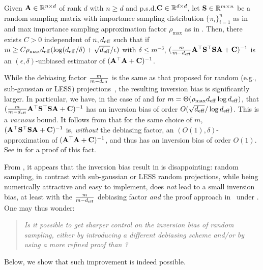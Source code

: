 \documentclass[11pt,a4paper]{article}
\begin{document}
\begin{proposition}
\label{prop:coarse-RS}
Given $\mathbf{A}\in {\mathbb{R}}^{n\times d}$ of rank $d$ with $n \geq d$ and p.s.d.\@ $\mathbf{C}\in {\mathbb{R}}^{d\times d}$, let $\mathbf{S} \in {\mathbb{R}}^{m \times n}$ be a random sampling  matrix with importance sampling distribution $\{ \pi_i \}_{i=1}^n$ as in  and max importance sampling approximation factor $\rho_{\max}$ as in .
Then, there exists $C > 0$ independent of $n,d_{\mathrm{eff}}$ such that if $m\geq C \rho_{\max} d_{\mathrm{eff}}(\log(d_{\mathrm{eff}}/\delta )+\sqrt{d_{\mathrm{eff}}}/\epsilon)$ with $\delta\leq m^{-3}$, $(\frac{m}{m-d_{\mathrm{eff}}}\mathbf{A}^\top  \mathbf{S}^\top\mathbf{S}  \mathbf{A} + \mathbf{C} )^{-1}$ is an $(\epsilon,\delta)$-unbiased estimator of $(\mathbf{A}^\top \mathbf{A} + \mathbf{C})^{-1}$.
\end{proposition}



\begin{remark}\normalfont
\label{rem:on_coarse}
While the debiasing factor $\frac{m}{m - d_{\mathrm{eff}}}$ is the same as that proposed for random (e.g., sub-gaussian or LESS) projections~\citep{derezinski2021newtonless,derezinski2021sparse}, the resulting inversion bias is significantly larger.
In particular, we have, in the case of  and for $m= \Theta (\rho_{\max} d_{\mathrm{eff}}\log d_{\mathrm{eff}})$, that $ ( \frac{m}{m-d_{\mathrm{eff}}} \mathbf{A}^\top  \mathbf{S}^\top\mathbf{S}  \mathbf{A} + \mathbf{C} )^{-1}$ has an inversion bias of order $O(\sqrt{d_{\mathrm{eff}}}/\log d_{\mathrm{eff}} )$. 
This is a \emph{vacuous} bound. It follows from  that for the same choice of $m$, $ (\mathbf{A}^\top  \mathbf{S}^\top\mathbf{S}  \mathbf{A} + \mathbf{C} )^{-1}$ is, \emph{without} the debiasing factor, an $(O(1),\delta)$-approximation of $(\mathbf{A}^\top \mathbf{A} + \mathbf{C})^{-1}$, and thus has an inversion bias of order $O(1)$.
See  in  for a proof of this fact.
\end{remark}

From , it appears that the inversion bias result in  is disappointing: 
random sampling, in contrast with sub-gaussian or LESS random projections, while being numerically attractive and easy to implement, does \emph{not} lead to a small inversion bias, at least with the $\frac{m}{m - d_{\mathrm{eff}}}$ debiasing factor \emph{and} the proof approach in~\citet{derezinski2021newtonless,derezinski2021sparse} under .
One may thus wonder:
\begin{quote}
  \emph{Is it possible to get sharper control on the inversion bias of random sampling, either by introducing a different debiasing scheme and/or by using a more refined proof than ?}
\end{quote}
Below, we show that such improvement is indeed possible.
\end{document}

